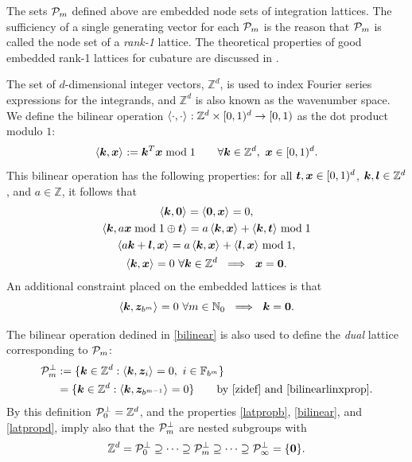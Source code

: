 \documentclass[graybox]{svmult}
\newcommand{\Z}{\mathbb{Z}} %
\newcommand{\N}{\mathbb{N}} %
\newcommand{\F}{\mathbb{F}} %
\newcommand{\bszero}{\boldsymbol{0}} %
\newcommand{\bst}{\boldsymbol{t}}    %
\newcommand{\bsx}{\boldsymbol{x}}    %
\newcommand{\bsz}{\boldsymbol{z}}    %
\begin{document}
The sets $\mathcal{P}_m$ defined above are embedded node sets of integration lattices. The sufficiency of a single generating vector for each $\mathcal{P}_m$ is the reason that $\mathcal{P}_m$ is called the node set of a \emph{rank-1} lattice. 
The theoretical properties of good embedded rank-1 lattices for cubature are discussed in \cite{HicNie03a}.  
 
The set of $d$-dimensional integer vectors, $\Z^d$, is used to index Fourier series expressions for the integrands, and $\Z^d$ is also known as the wavenumber space. We define the bilinear operation $\ip{\cdot}{\cdot}: \Z^d \times \cube \to [0,1)$ as the dot product modulo $1$: 
\begin{equation}\label{bilinear}
\ip{\bsk}{\bsx}:=\bsk^T\bsx\bmod 1 \qquad \forall \bsk \in \Z^d, \ \bsx \in \cube.
\end{equation}
This bilinear operation has the following properties: for all $\bst, \bsx \in \cube$, $\bsk, \bsl \in \Z^d$, and $a \in \Z$, it follows that
\begin{subequations}
\begin{gather}
\ip{\bsk}{\bszero} = \ip{\bszero}{\bsx} = 0,\\
\ip{\bsk}{a \bsx \bmod 1 \oplus \bst} = a\ip{\bsk}{\bsx} + \ip{\bsk}{\bst} \bmod 1 \label{bilinearlinxprop} \\
\ip{a \bsk + \bsl}{\bsx} = a\ip{\bsk}{\bsx} + \ip{\bsl}{\bsx} \bmod 1, \label{bilinearlinkprop}\\
\ip{\bsk}{\bsx} = 0 \ \forall \bsk \in \Z^d \ \implies \ \bsx=\bszero.\label{bilinearlinzeroprop}
\end{gather}
\end{subequations}
An additional constraint placed on the embedded lattices is that
\begin{equation}
\ip{\bsk}{\bsz_{b^m}} =  0 \ \forall m \in \N_0   \ \implies \ \bsk=\bszero. \label{latpropd}
\end{equation}

The bilinear operation dedined in \eqref{bilinear} is also used to define the \emph{dual} lattice corresponding to $\mathcal{P}_m$:
\begin{align}
\nonumber
\cp^{\perp}_m & := \{\bsk \in \Z^d : \ip{\bsk}{\bsz_i} = 0, \ i\in \F_{b^m}\} \\
&= \{\bsk \in \Z^d : \ip{\bsk}{\bsz_{b^{m-1}}} = 0 \} \qquad \text{by \eqref{zidef} and \eqref{bilinearlinxprop}} .\label{dualdef}
\end{align}
By this definition $\cp^{\perp}_{0}=\Z^d$, and the properties \eqref{latpropb}, \eqref{bilinear}, and \eqref{latpropd}, imply also that the $\mathcal{P}^{\perp}_m$ are nested subgroups with
\begin{equation}\label{dualemb}
\Z^d=\cp^{\perp}_{0}\supseteq\dots\supseteq\cp^{\perp}_{m}\supseteq\dots\supseteq\cp^{\perp}_{\infty}=\{\bszero\}.
\end{equation}
\end{document}
